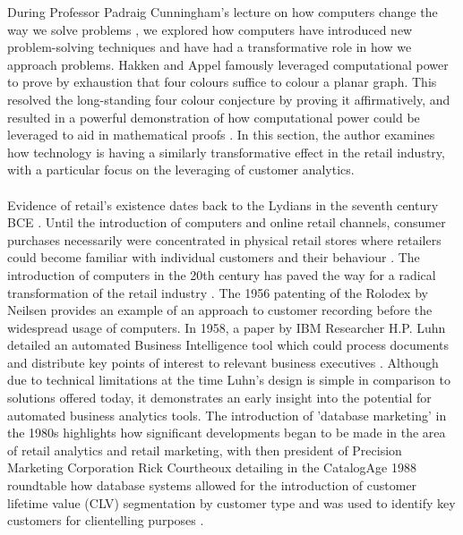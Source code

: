 \documentclass[11pt]{article}
\theoremstyle{plain}
\theoremstyle{definition}
\begin{document}
During Professor Padraig Cunningham's lecture on how computers change the way we solve problems \cite{CT5}, we explored how computers have introduced new problem-solving techniques and have had a transformative role in how we approach problems. Hakken and Appel famously leveraged computational power to prove by exhaustion that four colours suffice to colour a planar graph. This resolved the long-standing four colour conjecture by proving it affirmatively, and resulted in a powerful demonstration of how computational power could be leveraged to aid in mathematical proofs \cite{appel1977} \cite{appel1977_2}. In this section, the author examines how technology is having a similarly transformative effect in the retail industry, with a particular focus on the leveraging of customer analytics.\\
\\
Evidence of retail's existence dates back to the Lydians in the seventh century BCE \cite{HoM}. Until the introduction of computers and online retail channels, consumer purchases necessarily were concentrated in physical retail stores where retailers could become familiar with individual customers and their behaviour \cite{REINARTZ2019350}. The introduction of computers in the 20th century has paved the way for a radical transformation of the retail industry \cite{REINARTZ2019350}. The 1956 patenting of the Rolodex by Neilsen \cite{Rolodex} provides an example of an approach to customer recording before the widespread usage of computers. In 1958, a paper by IBM Researcher H.P. Luhn detailed an automated Business Intelligence tool which could process documents and distribute key points of interest to relevant business executives \cite{BI}. Although due to technical limitations at the time Luhn's design is simple in comparison to solutions offered today, it demonstrates an early insight into the potential for automated business analytics tools. The introduction of 'database marketing' in the 1980s highlights how significant developments began to be made in the area of retail analytics and retail marketing, with then president of Precision Marketing Corporation Rick Courtheoux detailing in the CatalogAge 1988 roundtable how database systems allowed for the introduction of customer lifetime value (CLV) segmentation by customer type and was used to identify key customers for clientelling purposes \cite{:1988aa}. \\
\\
\end{document}
